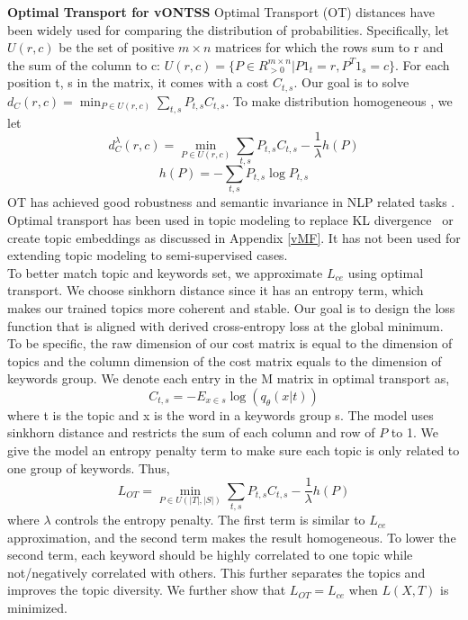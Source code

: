 \documentclass[11pt]{article}
\begin{document}
\textbf{Optimal Transport for vONTSS} Optimal Transport (OT) distances \cite{chen2019improving, torres2021survey} have been widely used for comparing the distribution of probabilities. Specifically, let $U(r,c)$ be the set of positive $m \times n$ matrices for which the rows sum to r and the sum of the column to c:
$U(r, c) = \{P \in R_{>0}^{m \times n}|P 1_{t} = r, P^{T} 1_{s} =c \}$. For each position t, s in the matrix, it comes with a cost $C_{t,s}$. Our goal is to solve $d_{C}(r, c) = \min_{P \in U(r, c)} \sum_{t, s} P_{t,s} C_{t,s}$. To make distribution homogeneous \cite{cuturi2013sinkhorn}, we let \begin{equation}d_{C}^{\lambda}(r, c) = \min_{P \in U(r, c)} \sum_{t,s} P_{t,s} C_{t, s} - \frac{1}{\lambda} h(P)\label{eq12} \end{equation}  
\begin{equation}h(P) = - \sum_{t,s} P_{t,s} \log P_{t,s}\label{eq13} \end{equation} OT has achieved good robustness and semantic invariance in NLP related tasks \cite{chen2019improving}. Optimal transport has been used in topic modeling to replace KL divergence~\cite{zhao2020neural,Huynh2020OTLDAAG,Wang2022RepresentingMO}  or create topic embeddings \cite{xu2018distilled} as discussed in Appendix \ref{vMF}. It has not been used for extending topic modeling to semi-supervised cases. \\
To better match topic and keywords set, we approximate $L_{ce}$ using optimal transport. We choose sinkhorn distance since it has an entropy term, which makes our trained topics more coherent and stable. Our goal is to design the loss function that is aligned with derived cross-entropy loss at the global minimum.  To be specific, the raw dimension of our cost matrix is equal to the dimension of topics and the column dimension of the cost matrix equals to the dimension of keywords group. We denote each entry in the M matrix in optimal transport as, \begin{equation}C_{t, s} = - E_{x \in s}\log(q_{\theta}(x|t))\label{eq15}\end{equation} where t is the topic and x is the word in a keywords group s. The model uses sinkhorn distance and restricts the sum of each column and row of $P$ to 1. We give the model an entropy penalty term to make sure each topic is only related to one group of keywords. Thus, \begin{equation} L_{OT} =   \min_{P \in U(|T|, |S|)} \sum_{t,s} P_{t,s} C_{t, s} - \frac{1}{\lambda} h(P) \label{eq4} \end{equation} where $\lambda$ controls the entropy penalty. The first term is similar to $L_{ce}$ approximation, and the second term makes the result homogeneous. To lower the second term, each keyword should be highly correlated to one topic while not/negatively correlated with others. This further separates the topics and improves the topic diversity. We further show that $L_{OT} = L_{ce}$ when $L(X, T)$ is minimized. 
\end{document}
